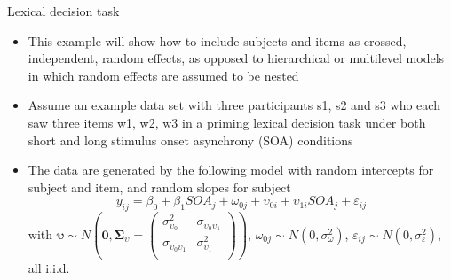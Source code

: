 \documentclass[aspectratio=169]{beamer}
\newcommand{\gvect}[1]{\boldsymbol{#1}}
\newcommand{\gmat}[1]{\boldsymbol{#1}}
\begin{document}
\begin{frame}{Lexical decision task \citep{Baayen2008}}
  \begin{itemize}
    \item This example will show how to include subjects and items as
      crossed, independent, random effects, as opposed to hierarchical or
      multilevel models in which random effects are assumed to be nested
    \item Assume an example data set with three participants s1, s2 and s3
      who each saw three items w1, w2, w3 in a priming lexical decision
      task under both short and long stimulus onset asynchrony (SOA) conditions
    \item The data are generated by the following model with random intercepts
      for subject and item, and random slopes for subject
  \[
    y_{ij} = \beta_0 + \beta_1 SOA_j + \omega_{0j} + \upsilon_{0i} +
      \upsilon_{1i} SOA_j + \varepsilon_{ij} 
  \]
\small
with $\gvect{\upsilon} \sim N\left(\gvect{0}, \gmat{\Sigma}_{\upsilon} = 
    \begin{pmatrix}
      \sigma^2_{\upsilon_0} & \sigma_{\upsilon_0\upsilon_1} \\
      \sigma_{\upsilon_0\upsilon_1} & \sigma^2_{\upsilon_1} \\
    \end{pmatrix}\right)$,
      $\omega_{0j} \sim N(0, \sigma_{\omega}^2)$, $\varepsilon_{ij} \sim N(0,
  \sigma_{\varepsilon}^2)$, all i.i.d. 
  \end{itemize}
\end{frame}
\end{document}
